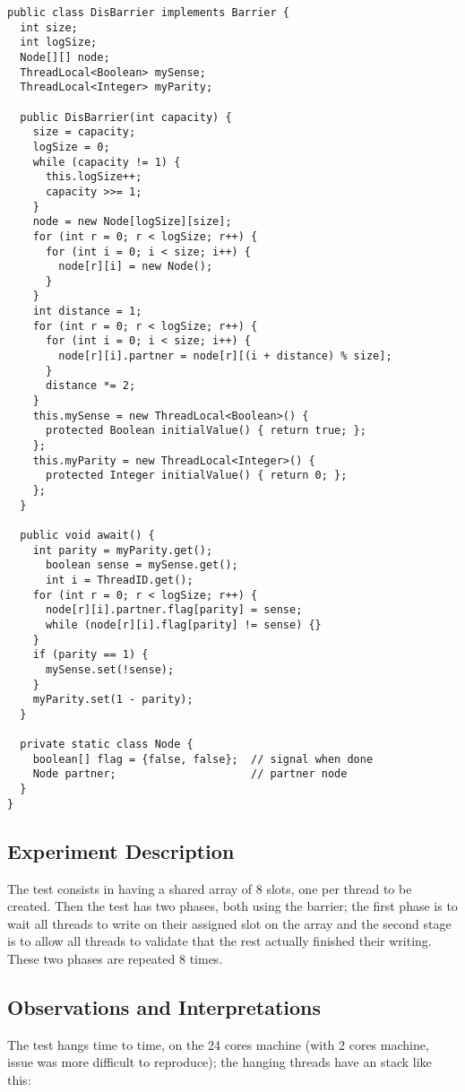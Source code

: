 \begin{lstlisting}[style=numbers]
public class DisBarrier implements Barrier {  
  int size;
  int logSize;
  Node[][] node;
  ThreadLocal<Boolean> mySense;
  ThreadLocal<Integer> myParity;
  
  public DisBarrier(int capacity) {
    size = capacity;
    logSize = 0;
    while (capacity != 1) {
      this.logSize++;
      capacity >>= 1;
    }
    node = new Node[logSize][size];
    for (int r = 0; r < logSize; r++) {
      for (int i = 0; i < size; i++) {
        node[r][i] = new Node();
      }
    }
    int distance = 1;
    for (int r = 0; r < logSize; r++) {
      for (int i = 0; i < size; i++) {
        node[r][i].partner = node[r][(i + distance) % size];
      }
      distance *= 2;
    }
    this.mySense = new ThreadLocal<Boolean>() {
      protected Boolean initialValue() { return true; };
    };
    this.myParity = new ThreadLocal<Integer>() {
      protected Integer initialValue() { return 0; };
    };
  }
  
  public void await() {
    int parity = myParity.get();
      boolean sense = mySense.get();
      int i = ThreadID.get();
    for (int r = 0; r < logSize; r++) {
      node[r][i].partner.flag[parity] = sense;
      while (node[r][i].flag[parity] != sense) {}
    }
    if (parity == 1) {
      mySense.set(!sense);
    }
    myParity.set(1 - parity);
  }
  
  private static class Node {
    boolean[] flag = {false, false};  // signal when done
    Node partner;                     // partner node
  }
}
\end{lstlisting}
\hfill

\subsection{Experiment Description}
The test consists in having a shared array of 8 slots, one per thread
to be created. Then the test has two phases, both using the barrier;
the first phase is to wait all threads to write on their assigned slot
on the array and the second stage is to allow all threads to validate
that the rest actually finished their writing. These two phases are
repeated 8 times. 

\subsection{Observations and Interpretations}
The test hangs time to time, on the 24 cores machine (with 2 cores
machine, issue was more difficult to reproduce);  the hanging threads
have an stack like this: \\  

